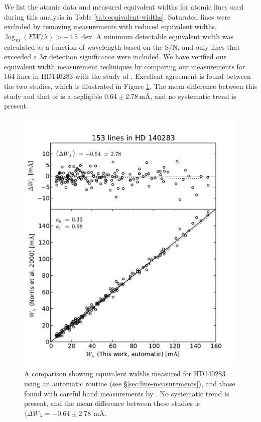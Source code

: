 \documentclass{emulateapj}
\begin{document}
We list the atomic data and measured equivalent widths for atomic lines used during this analysis in Table \ref{tab:equivalent-widths}. Saturated lines were excluded by removing measurements with reduced equivalent widths, $\log_{10}{(EW/\lambda)} > -4.5$\, dex. A minimum detectable equivalent width was calculated as a function of wavelength based on the S/N, and only lines that exceeded a $3\sigma$ detection significance were included. We have verified our equivalent width measurement techniques by comparing our measurements for 164 lines in HD140283 with the study of \citet{Norris;et-al_1996}. Excellent agreement is found between the two studies, which is illustrated in Figure \ref{fig:ew-compare}. The mean difference between this study and that of \cite{norris;et-al_1996} is a negligible $0.64 \pm 2.78$\,m\AA{}, and no systematic trend is present.


\begin{figure}[h]
	\includegraphics[width=\columnwidth]{./figures/smh-norris.pdf}
	\caption{A comparison showing equivalent widths measured for HD140283 using an automatic routine (see \S\ref{sec:line-measurements}), and those found with careful hand measurements by \citet{norris;et-al_1996}. No systematic trend is present, and the mean difference between these studies is $\langle\Delta{}W_\lambda = -0.64 \pm 2.78$ m\AA{}.}
	\label{fig:ew-compare}
\end{figure}
\end{document}
